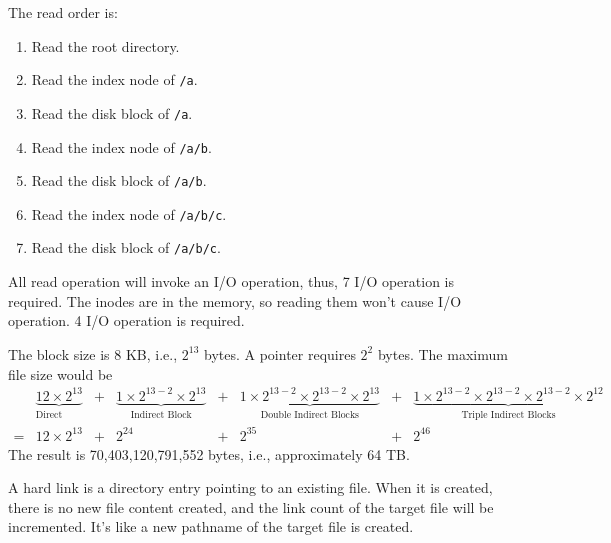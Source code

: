 \documentclass[11pt]{homework}
\begin{document}
\question
The read order is:
\begin{enumerate}
    \item Read the root directory.
    \item Read the index node of \texttt{/a}.
    \item Read the disk block of \texttt{/a}.
    \item Read the index node of \texttt{/a/b}.
    \item Read the disk block of \texttt{/a/b}.
    \item Read the index node of \texttt{/a/b/c}.
    \item Read the disk block of \texttt{/a/b/c}.
\end{enumerate}
\begin{alphaparts}
    \questionpart All read operation will invoke an I/O operation, thus, 7 I/O operation is required.
    \questionpart The inodes are in the memory, so reading them won't cause I/O operation. 4 I/O
    operation is required.
\end{alphaparts}
\question
The block size is 8 KB, i.e., $2^{13}$ bytes. A pointer requires $2^2$ bytes. The maximum file size
would be
$$
    \begin{aligned}
                                                       & \underbrace{12\times 2^{13}}_{\text{Direct Block}} & +                                            & \underbrace{1\times 2^{13-2}
        \times 2^{13}}_{\text{Indirect Block}}         & +                                                  & \underbrace{1\times 2^{13-2} \times 2^{13-2}
        \times 2^{13}}_{\text{Double Indirect Blocks}} & +                                                  & \underbrace{1\times 2^{13-2}
        \times 2^{13-2} \times 2^{13-2}\times 2^{12}}_{\text{Triple Indirect Blocks}}                                                                                                                               \\
        =                                              & 12 \times 2^{13}                                   & +                                            & 2^{24}                       & + & 2^{35} & + & 2^{46}
    \end{aligned}
$$
The result is 70,403,120,791,552 bytes, i.e., approximately 64 TB.

\question
A hard link is a directory entry pointing to an existing file. When it is created, there is no new
file content created, and the link count of the target file will be incremented. It's like a new
pathname of the target file is created.
\end{document}
